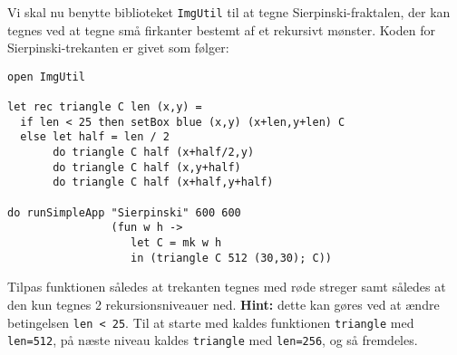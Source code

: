 
\label{sierpinski.ov}
Vi skal nu benytte biblioteket \texttt{ImgUtil} til at tegne
Sierpinski-fraktalen, der kan tegnes ved at tegne små firkanter
bestemt af et rekursivt mønster. Koden for Sierpinski-trekanten er
givet som følger:
\begin{lstlisting}[numbers=none,frame=none,mathescape]
open ImgUtil

let rec triangle C len (x,y) =
  if len < 25 then setBox blue (x,y) (x+len,y+len) C
  else let half = len / 2
       do triangle C half (x+half/2,y)
       do triangle C half (x,y+half)
       do triangle C half (x+half,y+half)

do runSimpleApp "Sierpinski" 600 600
                (fun w h ->
                   let C = mk w h
                   in (triangle C 512 (30,30); C))
\end{lstlisting}

Tilpas funktionen således at trekanten tegnes med røde streger samt
således at den kun tegnes 2 rekursionsniveauer ned. \textbf{Hint:} dette kan
gøres ved at ændre betingelsen \lstinline{len < 25}. Til at starte med
kaldes funktionen \lstinline{triangle} med \lstinline{len=512}, på
næste niveau kaldes \lstinline{triangle} med \lstinline{len=256}, og
så fremdeles.
